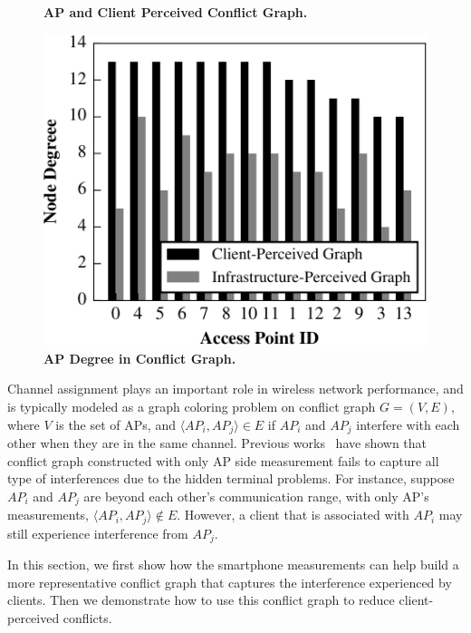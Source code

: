 \begin{figure}[t]
\begin{minipage}[t]{0.33\textwidth}
    \caption{\textbf{AP and Client Perceived Conflict Graph.}}
    \label{fig:conflict}
  \end{minipage}\hspace{0.02\textwidth}%
  \begin{minipage}[t]{0.31\textwidth}
    \includegraphics[width=\textwidth]{./figures/DavisConflictDegree.pdf}
    \caption{\textbf{AP Degree in Conflict Graph.}}
    \label{fig:conflict_degree}
  \end{minipage}
  \vspace*{\aftercaptiongap}
\end{figure}


Channel assignment plays an important role in wireless network performance, and
is typically modeled as a graph coloring problem on conflict graph $G=(V, E)$,
where $V$ is the set of APs, and $\langle AP_i, AP_j \rangle \in E$ if $AP_i$
and $AP_j$ interfere with each other when they are in the same channel. Previous
works~\cite{mishra2005weighted,mishra2006client} have shown that conflict graph
constructed with only AP side measurement fails to capture all type of interferences
due to the hidden terminal problems. For instance, suppose
$AP_i$ and $AP_j$ are beyond each other's communication range, with only AP's
measurements, $\langle AP_i, AP_j \rangle \notin E$. However, a client that is
associated with $AP_i$ may still experience interference from $AP_j$.

In this section, we first show how the smartphone measurements can help build a
more representative conflict graph that captures the interference experienced by
clients. Then we demonstrate how to use this conflict graph to reduce
client-perceived conflicts.

